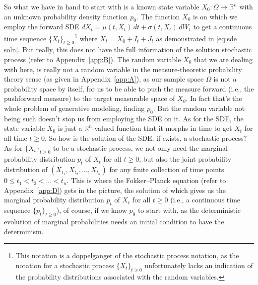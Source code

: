 \documentclass[11pt]{amsart}
\theoremstyle{plain}
\theoremstyle{definition}
\theoremstyle{remark}
\numberwithin{equation}{section}
\begin{document}
{So what we have in hand to start with is a known state variable $X_0 : \Omega \to \mathbb{R}^n$ with an unknown probability density function $p_0$. 
The function $X_0$ is on which we employ the forward SDE $dX_t = \mu(t, X_t)\,dt + \sigma(t, X_t)\,dW_t$ to get a continuous time sequence $\{X_t\}_{t \geq 0}$\footnote{This notation is a doppelganger of the stochastic process notation, as the notation for a stochastic process $\{X_t\}_{t \geq 0}$ unfortunately lacks an indication of the probability distributions associated with the random variables.} where $X_t = X_0+I_t+J_t$ as demonstrated in \eqref{eq:sde soln}.
But really, this does not have the full information of the solution stochastic process (refer to Appendix~\ref{app:B}). 
The random variable $X_0$ that we are dealing with here, is really not a random variable in the measure-theoretic probability theory sense (as given in Appendix~\ref{app:A}), as our sample space $\Omega$ is not a probability space by itself, for us to be able to push the measure forward (i.e., the pushforward measure) to the target measurable space of $X_0$. 
In fact that's the whole problem of generative modeling, finding $p_0$. But the random variable not being such doesn't stop us from employing the SDE on it. 
As for the SDE, the state variable $X_0$ is just a $\mathbb{R}^n$-valued function that it morphs in time to get $X_t$ for all time $t \geq 0$. 
So how is the solution of the SDE, if exists, a stochastic process? As for $\{X_t\}_{t \geq 0}$ to be a stochastic process, we not only need the marginal probability distribution $p_t$ of $X_t$ for all $t \geq 0$, but also the joint probability distribution of $(X_{t_1}, X_{t_2}, \ldots, X_{t_n})$ for any finite collection of time points $0 \leq t_1 < t_2 < \ldots < t_n$. 
This is where the Fokker--Planck equation (refer to Appendix~\ref{app:D}) gets in the picture, the solution of which gives us the marginal probability distribution $p_t$ of $X_t$ for all $t \geq 0$ (i.e., a continuous time sequence $\{p_t\}_{t \geq 0}$), of course, if we know $p_0$ to start with, as the deterministic evolution of marginal probabilities needs an initial condition to have the determinism.\\

}
\end{document}
